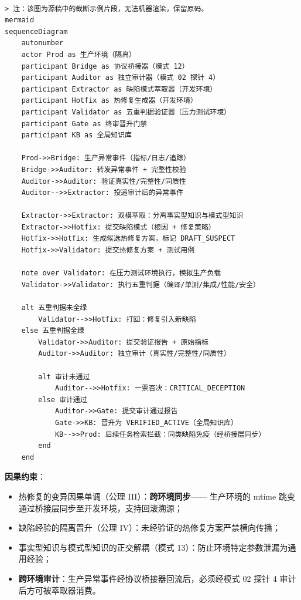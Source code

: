 \begin{verbatim}

> 注：该图为源稿中的截断示例片段，无法机器渲染，保留原码。
mermaid
sequenceDiagram
    autonumber
    actor Prod as 生产环境（隔离）
    participant Bridge as 协议桥接器（模式 12）
    participant Auditor as 独立审计器（模式 02 探针 4）
    participant Extractor as 缺陷模式萃取器（开发环境）
    participant Hotfix as 热修复生成器（开发环境）
    participant Validator as 五重判据验证器（压力测试环境）
    participant Gate as 终审晋升门禁
    participant KB as 全局知识库

    Prod->>Bridge: 生产异常事件（指标/日志/追踪）
    Bridge->>Auditor: 转发异常事件 + 完整性校验
    Auditor->>Auditor: 验证真实性/完整性/同质性
    Auditor-->>Extractor: 投递审计后的异常事件
    
    Extractor->>Extractor: 双模萃取：分离事实型知识与模式型知识
    Extractor->>Hotfix: 提交缺陷模式（根因 + 修复策略）
    Hotfix->>Hotfix: 生成候选热修复方案，标记 DRAFT_SUSPECT
    Hotfix->>Validator: 提交热修复方案 + 测试用例
    
    note over Validator: 在压力测试环境执行，模拟生产负载
    Validator->>Validator: 执行五重判据（编译/单测/集成/性能/安全）
    
    alt 五重判据未全绿
        Validator-->>Hotfix: 打回：修复引入新缺陷
    else 五重判据全绿
        Validator->>Auditor: 提交验证报告 + 原始指标
        Auditor->>Auditor: 独立审计（真实性/完整性/同质性）
        
        alt 审计未通过
            Auditor-->>Hotfix: 一票否决：CRITICAL_DECEPTION
        else 审计通过
            Auditor->>Gate: 提交审计通过报告
            Gate->>KB: 晋升为 VERIFIED_ACTIVE（全局知识库）
            KB-->>Prod: 后续任务检索拦截：同类缺陷免疫（经桥接层同步）
        end
    end
\end{verbatim}

\textbf{因果约束}：

\begin{itemize}
\item
  热修复的变异因果单调（公理 III）：\textbf{跨环境同步}------ 生产环境的
  mtime 跳变通过桥接层同步至开发环境，支持回滚溯源；
\item
  缺陷经验的隔离晋升（公理 IV）：未经验证的热修复方案严禁横向传播；
\item
  事实型知识与模式型知识的正交解耦（模式
  13）：防止环境特定参数泄漏为通用经验；
\item
  \textbf{跨环境审计}：生产异常事件经协议桥接器回流后，必须经模式 02
  探针 4 审计后方可被萃取器消费。
\end{itemize}

